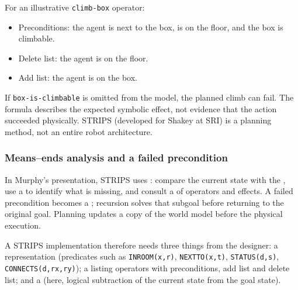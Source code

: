 For an illustrative \texttt{climb-box} operator:
\begin{itemize}
\item Preconditions: the agent is next to the box, is on the floor, and the box is climbable.
\item Delete list: the agent is on the floor.
\item Add list: the agent is on the box.
\end{itemize}
If \texttt{box-is-climbable} is omitted from the model, the planned climb can fail. The formula describes the expected symbolic effect, not evidence that the action succeeded physically. STRIPS (developed for Shakey at SRI) is a planning method, not an entire robot architecture.

\subsubsection{Means--ends analysis and a failed precondition}
In Murphy's presentation, STRIPS uses : compare the current state with the , use a  to identify what is missing, and consult a  of operators and effects. A failed precondition becomes a ; recursion solves that subgoal before returning to the original goal. Planning updates a copy of the world model before the physical execution.

A STRIPS implementation therefore needs three things from the designer: a  representation (predicates such as \texttt{INROOM(x,r)}, \texttt{NEXTTO(x,t)}, \texttt{STATUS(d,s)}, \texttt{CONNECTS(d,rx,ry)}); a  listing operators with preconditions, add list and delete list; and a  (here, logical subtraction of the current state from the goal state).

